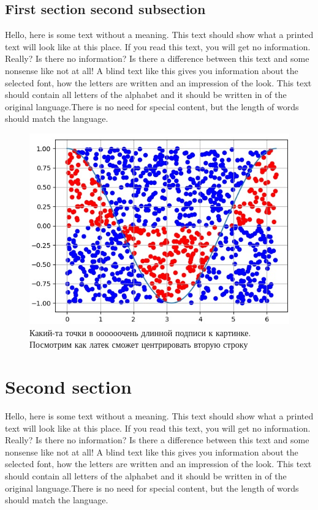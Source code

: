 \documentclass[a4paper,14pt]{extarticle}
\begin{document}
    \subsection{First section second subsection}

    Hello, here is some text without a meaning. This text should show what 
    a printed text will look like at this place. If you read this text, 
    you will get no information.  Really?  Is there no information?  Is there 
    a difference between this text and some nonsense like not at all!  A 
    blind text like this gives you information about the selected font, how 
    the letters are written and an impression of the look.  This text should
    contain all letters of the alphabet and it should be written in of the
    original language.There is no need for special content, but the length of
    words should match the language.

    \begin{figure}[H]
        \includegraphics{Points}
        \caption{Какий-та точки в оооооочень длинной подписи к картинке.
            Посмотрим как латек сможет центрировать вторую строку}
    \end{figure}

    \section{Second section}

    Hello, here is some text without a meaning.  This text should show what 
    a printed text will look like at this place.  If you read this text, 
    you will get no information.  Really?  Is there no information?  Is there 
    a difference between this text and some nonsense like not at all!  A 
    blind text like this gives you information about the selected font, how 
    the letters are written and an impression of the look.  This text should
    contain all letters of the alphabet and it should be written in of the
    original language.There is no need for special content, but the length of
    words should match the language.
\end{document}
